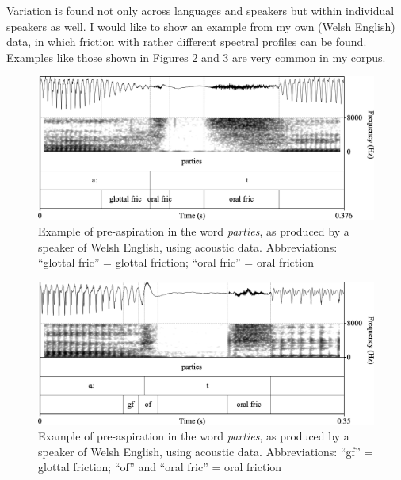\documentclass[output=paper]{langscibook}
\begin{document}
Variation is found not only across languages and speakers but within individual speakers as well. I would like to show an example from my own (Welsh English) data, in which friction with rather different spectral profiles can be found. Examples like those shown in Figures 2 and 3 are very common in my corpus.

  
\begin{figure}
\includegraphics[width=\textwidth]{figures/Hejna-img002.png}
\caption{\label{fig:hejna:2}Example of pre\hyp aspiration in the word \textit{parties}, as produced by a speaker of Welsh English, using acoustic data. Abbreviations: ``glottal fric'' = glottal friction; ``oral fric'' = oral friction}
\end{figure}

  
\begin{figure}
\includegraphics[width=\textwidth]{figures/Hejna-img003.png}
\caption{\label{fig:hejna:3}Example of pre\hyp aspiration in the word \textit{parties}, as produced by a speaker of Welsh English, using acoustic data. Abbreviations: ``gf'' = glottal friction; ``of'' and ``oral fric'' = oral friction}
\end{figure}
\end{document}
